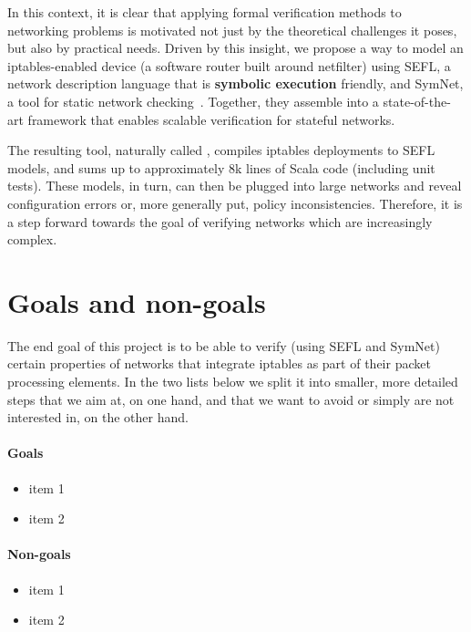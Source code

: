 In this context, it is clear that applying formal verification methods to
networking problems is motivated not just by the theoretical challenges it
poses, but also by practical needs.  Driven by this insight, we propose a way
to model an iptables-enabled device (a software router built around netfilter)
using SEFL, a network
description language that is \textbf{symbolic execution} friendly, and SymNet,
a tool for static network checking~\cite{stoenescu2016symnet,
stoenescu2013symnet}.  Together, they assemble into a state-of-the-art
framework that enables scalable verification for stateful networks.

The resulting tool, naturally called \TOOL, compiles iptables deployments to
SEFL models, and sums up to approximately 8k lines of Scala code (including
unit tests).  These models, in turn, can then be plugged into large networks
and reveal configuration errors or, more generally put, policy inconsistencies.
Therefore, it is a step forward towards the goal of verifying networks which
are increasingly complex.


\section{Goals and non-goals}

The end goal of this project is to be able to verify (using SEFL and SymNet)
certain properties of networks that integrate iptables as part of their packet
processing elements.  In the two lists below we split it into smaller, more
detailed steps that we aim at, on one hand, and that we want to avoid or simply
are not interested in, on the other hand.

\paragraph{Goals}
\begin{itemize}
  \item item 1
  \item item 2
\end{itemize}

\paragraph{Non-goals}
\begin{itemize}
  \item item 1
  \item item 2
\end{itemize}
